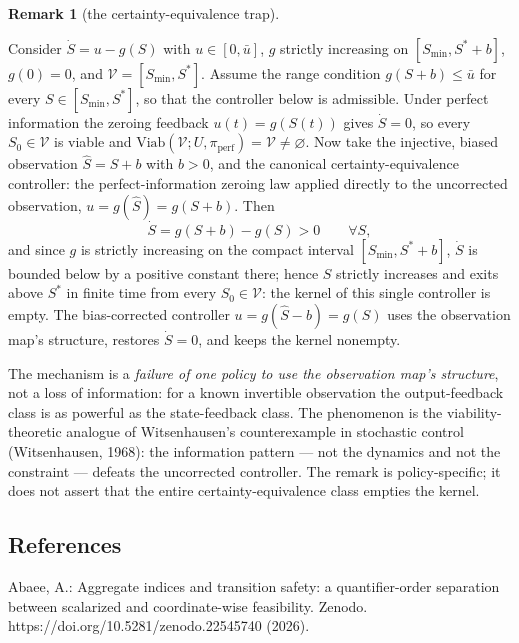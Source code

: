 \documentclass[11pt]{article}
\theoremstyle{definition}
\newtheorem{remark}{Remark}
\begin{document}
\begin{remark}[the certainty-equivalence trap]\label{rem:ce-trap}

Consider \(\dot S = u - g(S)\) with \(u \in [0, \bar u]\), \(g\) strictly
increasing on \([S_{\min}, S^* + b]\), \(g(0) = 0\), and
\(\mathcal{V} = [S_{\min}, S^*]\). Assume the range condition
\(g(S + b) \le \bar u\) for every \(S \in [S_{\min}, S^*]\), so that the
controller below is admissible. Under perfect information the zeroing
feedback \(u(t) = g(S(t))\) gives \(\dot S = 0\), so every
\(S_0 \in \mathcal{V}\) is viable and
\(\mathrm{Viab}(\mathcal{V}; U, \pi_{\mathrm{perf}}) = \mathcal{V} \neq \varnothing\).
Now take the injective, biased observation \(\hat S = S + b\) with
\(b > 0\), and the canonical certainty-equivalence controller: the
perfect-information zeroing law applied directly to the uncorrected
observation, \(u = g(\hat S) = g(S + b)\). Then
\[\dot S = g(S + b) - g(S) > 0 \qquad \forall S,\]
and since \(g\) is strictly increasing on the compact interval
\([S_{\min}, S^* + b]\), \(\dot S\) is bounded below by a positive
constant there; hence \(S\) strictly increases and exits above \(S^*\) in
finite time from every \(S_0 \in \mathcal{V}\): the kernel of this single
controller is empty. The bias-corrected controller
\(u = g(\hat S - b) = g(S)\) uses the observation map's structure, restores
\(\dot S = 0\), and keeps the kernel nonempty.

The mechanism is a \emph{failure of one policy to use the observation
map's structure}, not a loss of information: for a known invertible
observation the output-feedback class is as powerful as the
state-feedback class. The phenomenon is the viability-theoretic analogue
of Witsenhausen's counterexample in stochastic control (Witsenhausen,
1968): the information pattern --- not the dynamics and not the
constraint --- defeats the uncorrected controller. The remark is
policy-specific; it does not assert that the entire certainty-equivalence
class empties the kernel.

\end{remark}

\subsection{References}\label{references}

Abaee, A.: Aggregate indices and transition safety: a quantifier-order separation between scalarized and coordinate-wise feasibility. Zenodo. https://doi.org/10.5281/zenodo.22545740 (2026).
\end{document}
